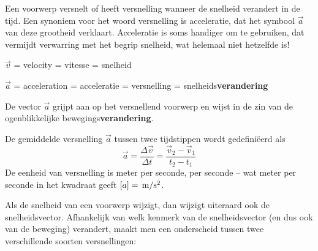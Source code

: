 \documentclass{ximera}
\begin{document}
	\author{Bart Lambregs, Vincent Gellens}
    \xmsource\xmuitleg

	
Een voorwerp versnelt of heeft versnelling wanneer de snelheid verandert in de tijd. Een synoniem voor het woord versnelling is acceleratie, dat het symbool \(\vec{a}\) van deze grootheid verklaart. 
Acceleratie is soms handiger om te gebruiken, dat vermijdt verwarring met het begrip snelheid, wat helemaal niet hetzelfde is!

\(\vec{v}\) = velocity = vitesse = snelheid

\(\vec{a}\) = acceleration = acceleratie = versnelling = snelheids\textbf{verandering}

De vector \(\vec{a}\) grijpt aan op het versnellend voorwerp en wijst in de zin van de ogenblikkelijke bewegings\textbf{verandering}.

\begin{definition}

De gemiddelde versnelling \(\vec{a}\) tussen twee tijdstippen wordt gedefiniëerd als
\[
\vec{a}=\frac{\Delta \vec{v}}{\Delta t}=\frac{\vec{v}_2-\vec{v}_1}{t_2-t_1}
\]
De eenheid van versnelling is meter per seconde, per seconde -- wat meter per seconde in het kwadraat geeft $[a]=\rm\,m/s^2$.

\end{definition}

Als de snelheid van een voorwerp wijzigt, dan wijzigt uiteraard ook de snelheidsvector. Afhankelijk van welk kenmerk van de snelheidsvector (en dus ook van de beweging) verandert, maakt men een onderscheid tussen twee verschillende soorten versnellingen:
\end{document}
